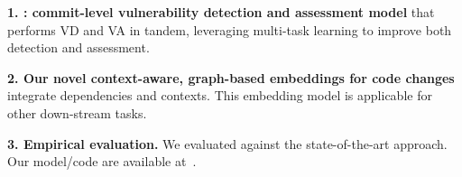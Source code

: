 {\bf 1. {\tool}: commit-level vulnerability detection and assessment
  model} that performs VD and VA in tandem, leveraging multi-task
learning to improve both detection and assessment.


{\bf 2. Our novel context-aware, graph-based embeddings for code
  changes}
integrate dependencies and contexts. This embedding model
is applicable for other down-stream tasks.


{\bf 3. Empirical evaluation.} We evaluated {\tool}
against the state-of-the-art approach.
Our model/code are available at~\cite{cat-website}.


